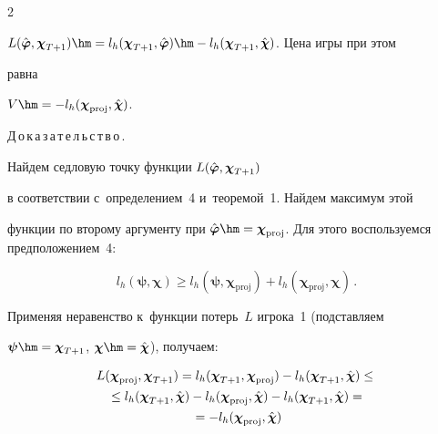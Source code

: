 \begin{multicols}{2}
{$L(\hphi, \boldsymbol{\chi}_{T+1})\hm = l_h(\boldsymbol{\chi}_{T+1},

\hphi) \hm- l_h(\boldsymbol{\chi}_{T+1}, \hchi)$. Цена игры при этом

равна} $V \hm= -l_h(\boldsymbol{\chi}_{\mathrm{proj}}, \hchi)$.





\smallskip



\noindent

Д\,о\,к\,а\,з\,а\,т\,е\,л\,ь\,с\,т\,в\,о\,.\ \

Найдем седловую точку функции $L(\hat{\boldsymbol{\varphi}}, \boldsymbol{\chi}_{T+1})$

в соответствии с~определением~4  и~теоремой~1. Найдем максимум этой

функции по второму аргументу при $\hphi \hm=

\boldsymbol{\chi}_{\mathrm{proj}}$. Для этого воспользуемся предположением~4:

$$

    l_h(\boldsymbol{\psi}, \boldsymbol{\chi}) \geq l_h(\boldsymbol{\psi},

    \boldsymbol{\chi}_{\mathrm{proj}}) + l_h(\boldsymbol{\chi}_{\mathrm{proj}},

    \boldsymbol{\chi})\,.

$$

Применяя неравенство к~функции потерь~$L$ игрока~1 (подставляем

$\boldsymbol{\psi} \hm= \boldsymbol{\chi}_{T+1}$, $\boldsymbol{\chi}

\hm= \hchi$), получаем:

\begin{multline*}

    L(\boldsymbol{\chi}_{\mathrm{proj}}, \boldsymbol{\chi}_{T+1})

     = l_h(\boldsymbol{\chi}_{T+1}, \boldsymbol{\chi}_{\mathrm{proj}}) -

      l_h(\boldsymbol{\chi}_{T+1}, \hchi) \leq{}\\

      {}\leq

    l_h(\boldsymbol{\chi}_{T+1}, \hchi) -

    l_h(\boldsymbol{\chi}_{\mathrm{proj}}, \hchi) -l_h(\boldsymbol{\chi}_{T+1},

    \hchi) ={}

\\{}

    = -l_h(\boldsymbol{\chi}_{\mathrm{proj}}, \hchi) \end{multline*}


\end{multicols}
